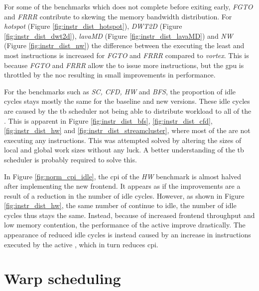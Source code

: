 For some of the benchmarks which does not complete before exiting early, \textit{FGTO} and \textit{FRRR} contribute to skewing the memory bandwidth distribution. For \textit{hotspot} (Figure \ref{fig:instr_dist_hotspot}), \textit{DWT2D} (Figure \ref{fig:instr_dist_dwt2d}), \textit{lavaMD} (Figure \ref{fig:instr_dist_lavaMD}) and \textit{NW} (Figure \ref{fig:instr_dist_nw}) the difference between the  executing the least and most instructions is increased for \textit{FGTO} and \textit{FRRR} compared to \textit{\Gls{vortex}}. This is because \textit{FGTO} and \textit{FRRR} allow the  to issue more instructions, but the \acrshort{gpu} is throttled by the \acrshort{noc} resulting in small improvements in performance. 

For the benchmarks such as \textit{SC, CFD, HW} and \textit{BFS}, the proportion of idle cycles stays mostly the same for the baseline and new versions. These idle cycles are caused by the \acrshort{tb} scheduler not being able to distribute workload to all of the . This is apparent in Figure \ref{fig:instr_dist_bfs}, \ref{fig:instr_dist_cfd}, \ref{fig:instr_dist_hw} and \ref{fig:instr_dist_streamcluster}, where most of the  are not executing any instructions. This was attempted solved by altering the sizes of local and global work sizes without any luck. A better understanding of the \acrshort{tb} scheduler is probably required to solve this. 

In Figure \ref{fig:norm_cpi_idle}, the \acrshort{cpi} of the \textit{HW} benchmark is almost halved after implementing the new frontend. It appears as if the improvements are a result of a reduction in the number of idle cycles. However, as shown in Figure \ref{fig:instr_dist_hw}, the same number of  continue to idle, the number of idle cycles thus stays the same. Instead, because of increased frontend throughput and low memory contention, the performance of the active  improve drastically. The appearance of reduced idle cycles is instead caused by an increase in instructions executed by the active , which in turn reduces \acrshort{cpi}.   

\section{Warp scheduling} \label{sec:results_warp_scheduling}

